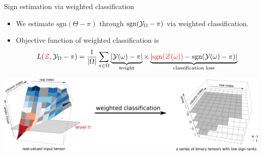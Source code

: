 \documentclass[10pt, mathserif]{beamer} %
\theoremstyle{definition}
\theoremstyle{plain}
\begin{document}
\begin{frame}{Sign estimation via weighted classification}
    \begin{itemize}
    \item We estimate {\color{red}$\text{sgn}(\Theta-\pi)$} through {\color{red}$\text{sgn}(\mathcal{Y}_\Omega-\pi)$} via weighted classification.
    \item Objective function of weighted classification is
    \begin{align}
    L({\color{red}\mathcal{Z}},\mathcal{Y}_\Omega-\pi) = \frac{1}{|\Omega|}\sum_{\pi\in\Omega}\underbrace{|\mathcal{Y}(\omega)-\pi|}_{\text{weight}}\times\underbrace{ |{\color{red}\text{sgn}(\mathcal{Z}(\omega))}-\text{sgn}(\mathcal{Y}(\omega)-\pi)|}_{\text{classification loss}}
    \end{align}
    \end{itemize}
      \begin{center}
    \includegraphics[width =\textwidth]{Figures/weightedclassification.pdf}
    \end{center}
    
\end{frame}
\end{document}
